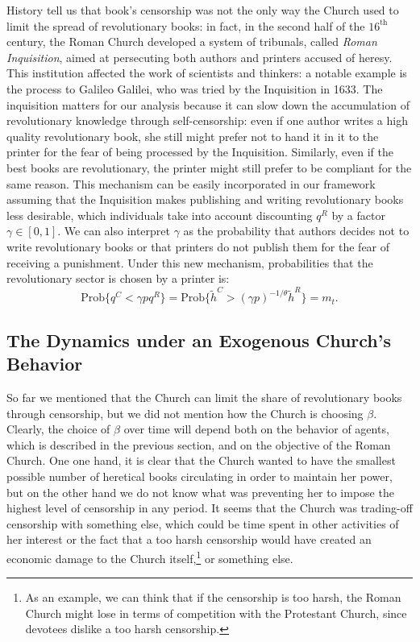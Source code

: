 \documentclass[12pt]{article}
\begin{document}
History tell us that book's censorship was not the only way the Church used to limit the spread of revolutionary books: in fact, in the second half of the $16^{\text{th}}$ century, the Roman Church developed a system of tribunals, called \textit{Roman Inquisition}, aimed at persecuting both authors and printers accused of heresy. This institution affected the work of scientists and thinkers: a notable example is the process to Galileo Galilei, who was tried by the Inquisition in 1633. The inquisition matters for our analysis because it can slow down the accumulation of revolutionary knowledge through self-censorship: even if one author writes a high quality revolutionary book, she still might prefer not to hand it in it to the printer for the fear of being processed by the Inquisition. Similarly, even if the best books are revolutionary, the printer might still prefer to be compliant for the same reason. This mechanism can be easily incorporated in our framework assuming that the Inquisition makes publishing and writing revolutionary books less desirable, which individuals take into account discounting $q^R$ by a factor $\gamma\in[0,1]$. We can also interpret $\gamma$ as the probability that authors decides not to write revolutionary books or that printers do not publish them for the fear of receiving a punishment. Under this new mechanism, probabilities that the revolutionary sector is chosen by a printer is:
\begin{equation}\label{eq:censorhip2}
\text{Prob}\{q^C<\gamma p q^R\}=\text{Prob}\{\tilde{h}^C>(\gamma p)^{-1/\theta}\tilde{h}^R\}=m_t.
\end{equation}
\subsection{The Dynamics under an Exogenous Church's Behavior}
So far we mentioned that the Church can limit the share of revolutionary books through censorship, but we did not mention how the Church is choosing $\beta$. Clearly, the choice of  $\beta$ over time will depend both on the behavior of agents, which is described in the previous section, and on the objective of the Roman Church. One one hand, it is clear that the Church wanted to have the smallest possible number of heretical books circulating in order to maintain her power, but on the other hand we do not know what was preventing her to impose the highest level of censorship in any period. It seems that the Church was trading-off censorship with something else, which could be time spent in other activities of her interest or the fact that a too harsh censorship would have created an economic damage to the Church itself,\footnote{As an example, we can think that if the censorship is too harsh, the Roman Church might lose in terms of competition with the Protestant Church, since devotees dislike a too harsh censorship.} or something else.
\end{document}
